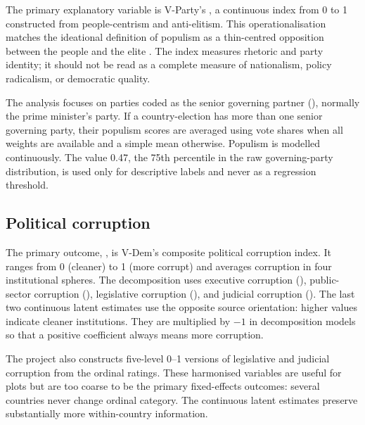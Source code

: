 The primary explanatory variable is V-Party's , a continuous index from 0 to 1
constructed from people-centrism and anti-elitism. This operationalisation matches the ideational
definition of populism as a thin-centred opposition between the people and the elite
\citep{mudde2004}. The index measures rhetoric and party identity; it should not be read as a complete
measure of nationalism, policy radicalism, or democratic quality.

The analysis focuses on parties coded as the senior governing partner
(), normally the prime minister's party. If a country-election has more than one
senior governing party, their populism scores are averaged using vote shares when all weights are
available and a simple mean otherwise. Populism is modelled continuously. The value 0.47, the 75th
percentile in the raw governing-party distribution, is used only for descriptive labels and never as a
regression threshold.

\subsection{Political corruption}

The primary outcome, , is V-Dem's composite political corruption index. It ranges
from 0 (cleaner) to 1 (more corrupt) and averages corruption in four institutional spheres. The
decomposition uses executive corruption (), public-sector corruption
(), legislative corruption (), and judicial corruption
(). The last two continuous latent estimates use the opposite source orientation:
higher values indicate cleaner institutions. They are multiplied by $-1$ in decomposition models so
that a positive coefficient always means more corruption.

The project also constructs five-level 0--1 versions of legislative and judicial corruption from the
ordinal ratings. These harmonised variables are useful for plots but are too coarse to be the primary
fixed-effects outcomes: several countries never change ordinal category. The continuous latent
estimates preserve substantially more within-country information.

